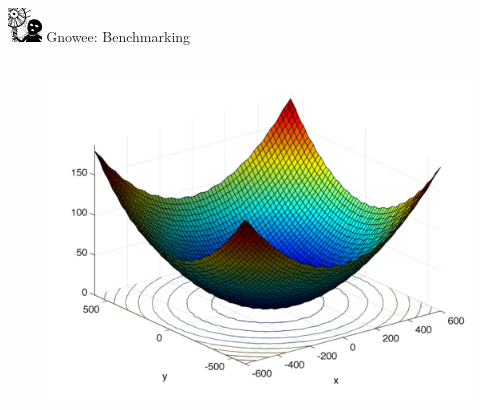 \documentclass[xcolor=x11names,compress,handout]{beamer}
\renewcommand{\(}{\begin{columns}}
\renewcommand{\)}{\end{columns}}
\newcommand{\<}[1]{\begin{column}{#1}}
\renewcommand{\>}{\end{column}}
\begin{document}
\begin{frame}{\includegraphics[width=0.35in]{../figs/Gnowee.png} Gnowee: Benchmarking \cite{Walton2013a,Yang2014,Civicioglu2013}}
\begin{columns}
\begin{column}{0.33\linewidth}
\begin{figure}[htp]
        \vspace{-0.35cm}
      \end{figure}       
      \vspace{-1.05cm} 
      \begin{figure}[htp]
        \centering
        \includegraphics[width=1.0\textwidth, height=0.25\textheight]{../figs/Griewank.png} 
        \vspace{-0.35cm}
      \end{figure}
    \end{column}
    

\end{columns}
\end{frame}
\end{document}
